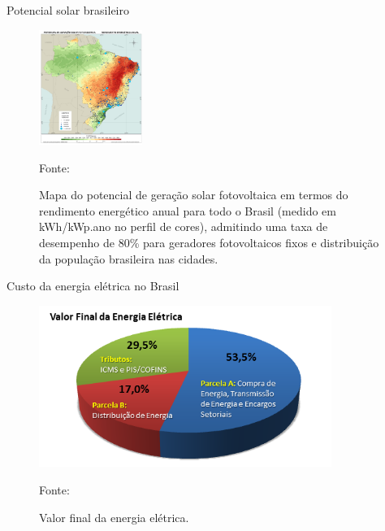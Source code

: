 \documentclass{beamer}
\begin{document}
\begin{frame}{Potencial solar brasileiro}

\begin{figure}[H]
    \centering
    \includegraphics[width=0.3\textwidth]{./Figuras/pot_geracao_solar.png}
    \caption{Mapa do potencial de geração solar fotovoltaica em termos do rendimento energético anual para todo o Brasil (medido em kWh/kWp.ano no perfil de cores), admitindo uma taxa de desempenho de 80\% para geradores fotovoltaicos fixos e distribuição da população brasileira nas cidades.}{Fonte: \cite{atlas2017}}
   \label{fig:pot_geracao_solar}
\end{figure}

\end{frame}


\begin{frame}{Custo da energia elétrica no Brasil}

\begin{figure}[H]
    \centering
    \includegraphics[width=0.85\textwidth]{./Figuras/valor_tarifa.png}
    \caption{Valor final da energia elétrica.}{Fonte: \cite{ANEEL_TARIFA}}
   \label{fig:valor_tarifa}
\end{figure}

\end{frame}

\end{document}
